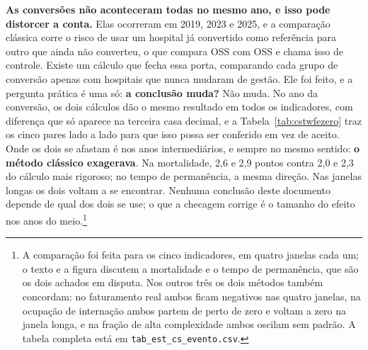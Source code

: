 \textbf{As conversões não aconteceram todas no mesmo ano, e isso pode
distorcer a conta.} Elas ocorreram em 2019, 2023 e 2025, e a comparação
clássica corre o risco de usar um hospital já convertido como referência
para outro que ainda não converteu, o que compara OSS com OSS e chama isso
de controle. Existe um cálculo que fecha essa porta, comparando cada
grupo de conversão apenas com hospitais que nunca mudaram de gestão. Ele
foi feito, e a pergunta prática é uma só: \textbf{a conclusão muda?} Não
muda. No ano da conversão, os dois cálculos dão o mesmo resultado em todos
os indicadores, com diferença que só aparece na terceira casa decimal, e a
Tabela~\ref{tab:cstwfezero} traz os cinco pares lado a lado para que isso
possa ser conferido em vez de aceito. Onde os dois se afastam é nos anos
intermediários, e sempre no mesmo sentido: \textbf{o método clássico
exagerava}. Na mortalidade, 2,6 e 2,9 pontos contra 2,0 e 2,3 do cálculo
mais rigoroso; no tempo de permanência, a mesma direção. Nas janelas
longas os dois voltam a se encontrar. Nenhuma conclusão deste documento
depende de qual dos dois se use; o que a checagem corrige é o tamanho do
efeito nos anos do meio.\footnote{A comparação foi feita
para os cinco indicadores, em quatro janelas cada um; o texto e a figura
discutem a mortalidade e o tempo de permanência, que são os dois
achados em disputa. Nos outros três os dois métodos também concordam:
no faturamento real ambos ficam negativos nas quatro janelas, na
ocupação de internação ambos partem de perto de zero e voltam a zero na
janela longa, e na fração de alta complexidade ambos oscilam sem
padrão. A tabela completa está em \texttt{tab\_est\_cs\_evento.csv}.}


